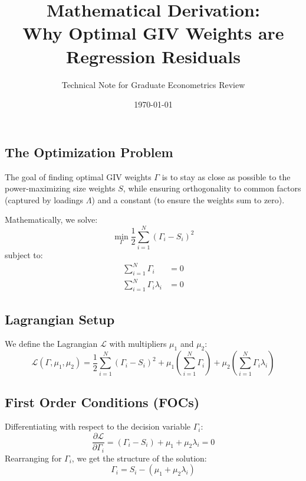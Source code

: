 \documentclass[11pt]{article}
\title{\color{DeepNavy}\huge Mathematical Derivation: \\ \Large Why Optimal GIV Weights are Regression Residuals}
\author{Technical Note for Graduate Econometrics Review}
\date{\today}
\begin{document}
\maketitle

\subsection{The Optimization Problem}
The goal of finding optimal GIV weights $\Gamma$ is to stay as close as possible to the power-maximizing size weights $S$, while ensuring orthogonality to common factors (captured by loadings $\Lambda$) and a constant (to ensure the weights sum to zero).

Mathematically, we solve:
\begin{equation}
\min_{\Gamma} \frac{1}{2} \sum_{i=1}^N (\Gamma_i - S_i)^2 
\end{equation}
subject to:
\begin{align}
\sum_{i=1}^N \Gamma_i &= 0 \tag{Constraint 1: Sum to Zero} \\
\sum_{i=1}^N \Gamma_i \lambda_i &= 0 \tag{Constraint 2: Orthogonality to $\lambda$}
\end{align}

\subsection{Lagrangian Setup}
We define the Lagrangian $\mathcal{L}$ with multipliers $\mu_1$ and $\mu_2$:
\begin{equation}
\mathcal{L}(\Gamma, \mu_1, \mu_2) = \frac{1}{2} \sum_{i=1}^N (\Gamma_i - S_i)^2 + \mu_1 \left( \sum_{i=1}^N \Gamma_i \right) + \mu_2 \left( \sum_{i=1}^N \Gamma_i \lambda_i \right)
\end{equation}

\subsection{First Order Conditions (FOCs)}
Differentiating with respect to the decision variable $\Gamma_i$:
\begin{equation}
\frac{\partial \mathcal{L}}{\partial \Gamma_i} = (\Gamma_i - S_i) + \mu_1 + \mu_2 \lambda_i = 0
\end{equation}
Rearranging for $\Gamma_i$, we get the structure of the solution:
\begin{equation} \label{eq:gamma_sol}
\Gamma_i = S_i - (\mu_1 + \mu_2 \lambda_i)
\end{equation}
\end{document}
